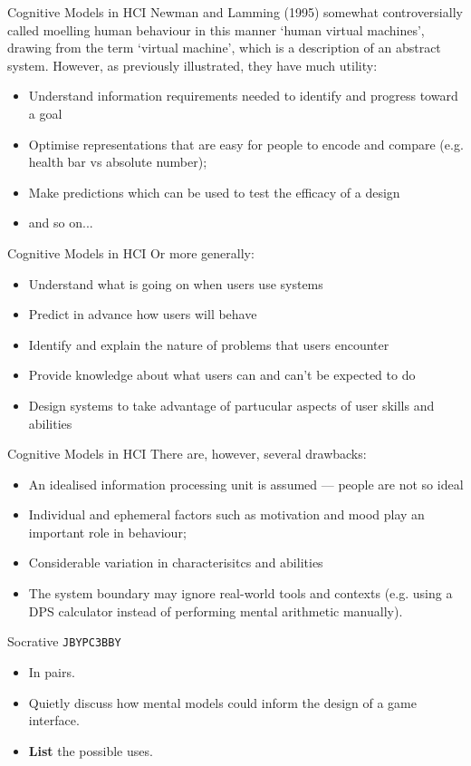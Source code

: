 \begin{frame}{Cognitive Models in HCI}
	Newman and Lamming (1995) somewhat controversially called moelling human behaviour in this manner `human virtual machines', drawing from the 
	term `virtual machine', which is a description of an abstract system. However, as previously illustrated, they have much utility:
	
	\vspace{2ex}

	\begin{itemize}
		\item Understand information requirements needed to identify and progress toward a goal
		\item Optimise representations that are easy for people to encode and compare (e.g. health bar vs absolute number);
		\item Make predictions which can be used to test the efficacy of a design
		\item and so on...
	\end{itemize}
\end{frame}

\begin{frame}{Cognitive Models in HCI}
	Or more generally:
	
	\vspace{2ex}

	\begin{itemize}
		\item Understand what is going on when users use systems
		\item Predict in advance how users will behave
		\item Identify and explain the nature of problems that users encounter
		\item Provide knowledge about what users can and can't be expected to do
		\item Design systems to take advantage of partucular aspects of user skills and abilities
	\end{itemize}
\end{frame}

\begin{frame}{Cognitive Models in HCI}
	There are, however, several drawbacks:
	
	\vspace{2ex}

	\begin{itemize}
		\item An idealised information processing unit is assumed --- people are not so ideal
		\item Individual and ephemeral factors such as motivation and mood play an important role in behaviour;
		\item Considerable variation in characterisitcs and abilities
		\item The system boundary may ignore real-world tools and contexts (e.g. using a DPS calculator instead of performing mental arithmetic manually).
	\end{itemize}
\end{frame}

\begin{frame}[fragile]{Socrative \texttt{JBYPC3BBY}}
	\begin{itemize}
		\item In pairs.
		\item Quietly discuss how mental models could inform the design of a game interface.
		\item \textbf{List} the possible uses.
	\end{itemize}
\end{frame}
